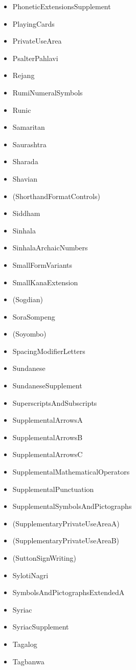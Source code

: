\documentclass{article}
\newenvironment{itemlist}{%
  \begin{itemize}
	\setlength{\itemsep}{0pt}
	\setlength{\parsep}{0pt}
	\setlength{\topsep}{0pt}
	\setlength{\partopsep}{0pt}
	\setlength{\parskip}{0pt}
	\setlength{\labelsep}{5pt}}%
{
  \end{itemize}}
\begin{document}
\begin{multicols*}{2}
\begin{itemlist}
				\item PhoneticExtensionsSupplement
				\item PlayingCards
				\item PrivateUseArea
				\item PsalterPahlavi
				\item Rejang
				\item RumiNumeralSymbols
				\item Runic
				\item Samaritan
				\item Saurashtra
				\item Sharada
				\item Shavian
				\item (ShorthandFormatControls)
				\item Siddham
				\item Sinhala
				\item SinhalaArchaicNumbers
				\item SmallFormVariants
				\item SmallKanaExtension
				\item (Sogdian)
				\item SoraSompeng
				\item (Soyombo)
				\item SpacingModifierLetters
				\item Sundanese
				\item SundaneseSupplement
				\item SuperscriptsAndSubscripts
				\item SupplementalArrowsA
				\item SupplementalArrowsB
				\item SupplementalArrowsC
				\item SupplementalMathematicalOperators
				\item SupplementalPunctuation
				\item SupplementalSymbolsAndPictographs
				\item (SupplementaryPrivateUseAreaA)
				\item (SupplementaryPrivateUseAreaB)
				\item (SuttonSignWriting)
				\item SylotiNagri
				\item SymbolsAndPictographsExtendedA
				\item Syriac
				\item SyriacSupplement
				\item Tagalog
				\item Tagbanwa

\end{itemlist}
\end{multicols*}
\end{document}
